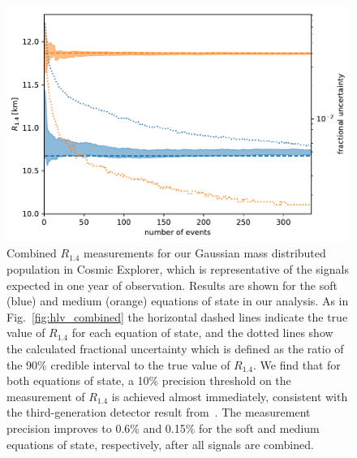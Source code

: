 \begin{figure}[ht]
\includegraphics[width=\textwidth]{Figures/eos-meas/final_pop_ce_combined_radius_3eos_gaussian_prior_seed1_bw0p3.pdf}
\caption{
Combined $R_{1.4}$ measurements for our Gaussian mass distributed population in Cosmic Explorer, which is representative of the signals expected in one year of observation. Results are shown for the soft (blue) and medium (orange) equations of state in our analysis. As in Fig.~\ref{fig:hlv_combined} the horizontal dashed lines indicate the true value of $R_{1.4}$ for each equation of state, and the dotted lines show the calculated fractional uncertainty which is defined as the ratio of the 90\% credible interval to the true value of $R_{1.4}$. We find that for both equations of state, a 10\% precision threshold on the measurement of $R_{1.4}$ is achieved almost immediately, consistent with the third-generation detector result from~\cite{Pacilio:2021jmq}. The measurement precision improves to 0.6\% and 0.15\% for the soft and medium equations of state, respectively, after all signals are combined.
}
\label{fig:ce_combined}
\end{figure}


